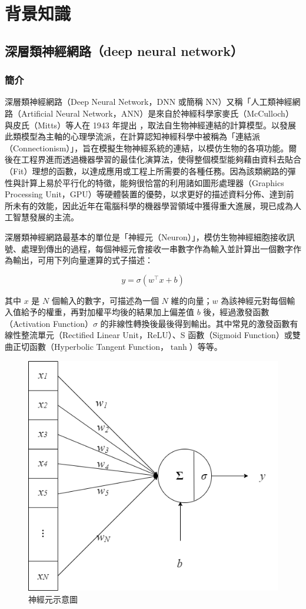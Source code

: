 
\chapter{背景知識}

\section{深層類神經網路（deep neural network）}

\subsection{簡介}

深層類神經網路（Deep Neural Network，DNN 或簡稱 NN）又稱「人工類神經網路（Artificial Neural Network，ANN）是來自於神經科學家麥氏（McCulloch）與皮氏（Mitts）等人在 1943 年提出 \cite{mcculloch1943logical}，取法自生物神經連結的計算模型。以發展此類模型為主軸的心理學流派，在計算認知神經科學中被稱為「連結派（Connectionism）」，旨在模擬生物神經系統的連結，以模仿生物的各項功能。爾後在工程界進而透過機器學習的最佳化演算法，使得整個模型能夠藉由資料去貼合（Fit）理想的函數，以達成應用或工程上所需要的各種任務。因為該類網路的彈性與計算上易於平行化的特徵，能夠很恰當的利用諸如圖形處理器（Graphics Processing Unit，GPU）等硬體裝置的優勢，以求更好的描述資料分佈、達到前所未有的效能，因此近年在電腦科學的機器學習領域中獲得重大進展，現已成為人工智慧發展的主流。

深層類神經網路最基本的單位是「神經元（Neuron）」，模仿生物神經細胞接收訊號、處理到傳出的過程，每個神經元會接收一串數字作為輸入並計算出一個數字作為輸出，可用下列向量運算的式子描述：

$$y=\sigma(w^\top x + b) $$

其中 $x$ 是 $N$ 個輸入的數字，可描述為一個 $N$ 維的向量；$w$ 為該神經元對每個輸入值給予的權重，再對加權平均後的結果加上偏差值 $b$ 後，經過激發函數（Activation Function）$\sigma$ 的非線性轉換後最後得到輸出。其中常見的激發函數有線性整流單元（Rectified Linear Unit，ReLU）、S 函數（Sigmoid Function）或雙曲正切函數（Hyperbolic Tangent Function，$\tanh$）等等。

\begin{figure}

\centering

\includegraphics[width=0.5\linewidth]{figures/neuron.drawio.png}

\caption{神經元示意圖}

\label{fig:single-neuron}

\end{figure}


